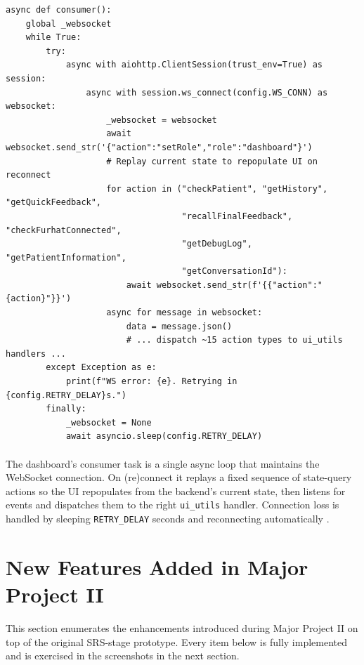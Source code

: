 \documentclass{article}
\begin{document}
\begin{lstlisting}[style=codeblock]
async def consumer():
    global _websocket
    while True:
        try:
            async with aiohttp.ClientSession(trust_env=True) as session:
                async with session.ws_connect(config.WS_CONN) as websocket:
                    _websocket = websocket
                    await websocket.send_str('{"action":"setRole","role":"dashboard"}')
                    # Replay current state to repopulate UI on reconnect
                    for action in ("checkPatient", "getHistory", "getQuickFeedback",
                                   "recallFinalFeedback", "checkFurhatConnected",
                                   "getDebugLog", "getPatientInformation",
                                   "getConversationId"):
                        await websocket.send_str(f'{{"action":"{action}"}}')
                    async for message in websocket:
                        data = message.json()
                        # ... dispatch ~15 action types to ui_utils handlers ...
        except Exception as e:
            print(f"WS error: {e}. Retrying in {config.RETRY_DELAY}s.")
        finally:
            _websocket = None
            await asyncio.sleep(config.RETRY_DELAY)
\end{lstlisting}

\paragraph{}
The dashboard's consumer task is a single async loop that maintains the WebSocket connection. On (re)connect it replays a fixed sequence of state-query actions so the UI repopulates from the backend's current state, then listens for events and dispatches them to the right \texttt{ui\_utils} handler. Connection loss is handled by sleeping \texttt{RETRY\_DELAY} seconds and reconnecting automatically \cite{Shen2019ALA}.

\newpage
\section{New Features Added in Major Project II}

This section enumerates the enhancements introduced during Major Project II on top of the original SRS-stage prototype. Every item below is fully implemented and is exercised in the screenshots in the next section.
\end{document}
